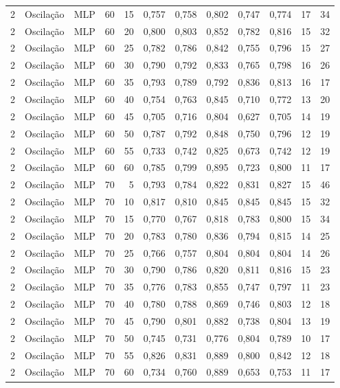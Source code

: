 \begin{longtable}{ccclrrrrrrrr}
2 & Oscilação & MLP & 60 & 15 & 0,757 & 0,758 & 0,802 & 0,747 & 0,774 & 17 & 34 \\
2 & Oscilação & MLP & 60 & 20 & 0,800 & 0,803 & 0,852 & 0,782 & 0,816 & 15 & 32 \\
2 & Oscilação & MLP & 60 & 25 & 0,782 & 0,786 & 0,842 & 0,755 & 0,796 & 15 & 27 \\
2 & Oscilação & MLP & 60 & 30 & 0,790 & 0,792 & 0,833 & 0,765 & 0,798 & 16 & 26 \\
2 & Oscilação & MLP & 60 & 35 & 0,793 & 0,789 & 0,792 & 0,836 & 0,813 & 16 & 17 \\
2 & Oscilação & MLP & 60 & 40 & 0,754 & 0,763 & 0,845 & 0,710 & 0,772 & 13 & 20 \\
2 & Oscilação & MLP & 60 & 45 & 0,705 & 0,716 & 0,804 & 0,627 & 0,705 & 14 & 19 \\
2 & Oscilação & MLP & 60 & 50 & 0,787 & 0,792 & 0,848 & 0,750 & 0,796 & 12 & 19 \\
2 & Oscilação & MLP & 60 & 55 & 0,733 & 0,742 & 0,825 & 0,673 & 0,742 & 12 & 19 \\
2 & Oscilação & MLP & 60 & 60 & 0,785 & 0,799 & 0,895 & 0,723 & 0,800 & 11 & 17 \\
2 & Oscilação & MLP & 70 & 5 & 0,793 & 0,784 & 0,822 & 0,831 & 0,827 & 15 & 46 \\
2 & Oscilação & MLP & 70 & 10 & 0,817 & 0,810 & 0,845 & 0,845 & 0,845 & 15 & 32 \\
2 & Oscilação & MLP & 70 & 15 & 0,770 & 0,767 & 0,818 & 0,783 & 0,800 & 15 & 34 \\
2 & Oscilação & MLP & 70 & 20 & 0,783 & 0,780 & 0,836 & 0,794 & 0,815 & 14 & 25 \\
2 & Oscilação & MLP & 70 & 25 & 0,766 & 0,757 & 0,804 & 0,804 & 0,804 & 14 & 26 \\
2 & Oscilação & MLP & 70 & 30 & 0,790 & 0,786 & 0,820 & 0,811 & 0,816 & 15 & 23 \\
2 & Oscilação & MLP & 70 & 35 & 0,776 & 0,783 & 0,855 & 0,747 & 0,797 & 11 & 23 \\
2 & Oscilação & MLP & 70 & 40 & 0,780 & 0,788 & 0,869 & 0,746 & 0,803 & 12 & 18 \\
2 & Oscilação & MLP & 70 & 45 & 0,790 & 0,801 & 0,882 & 0,738 & 0,804 & 13 & 19 \\
2 & Oscilação & MLP & 70 & 50 & 0,745 & 0,731 & 0,776 & 0,804 & 0,789 & 10 & 17 \\
2 & Oscilação & MLP & 70 & 55 & 0,826 & 0,831 & 0,889 & 0,800 & 0,842 & 12 & 18 \\
2 & Oscilação & MLP & 70 & 60 & 0,734 & 0,760 & 0,889 & 0,653 & 0,753 & 11 & 17 \\

\end{longtable}
